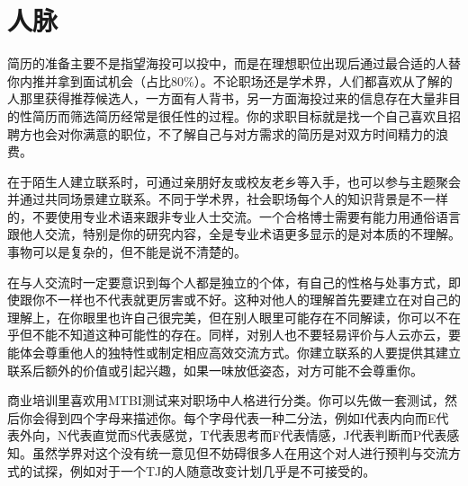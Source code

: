 \documentclass[]{tufte-book}
\newenvironment{Shaded}{}{}
\newcommand{\AttributeTok}[1]{\textcolor[rgb]{0.49,0.56,0.16}{#1}}
\newcommand{\CommentTok}[1]{\textcolor[rgb]{0.38,0.63,0.69}{\textit{#1}}}
\newcommand{\DecValTok}[1]{\textcolor[rgb]{0.25,0.63,0.44}{#1}}
\newcommand{\FunctionTok}[1]{\textcolor[rgb]{0.02,0.16,0.49}{#1}}
\newcommand{\NormalTok}[1]{#1}
\newcommand{\OtherTok}[1]{\textcolor[rgb]{0.00,0.44,0.13}{#1}}
\newcommand{\SpecialCharTok}[1]{\textcolor[rgb]{0.25,0.44,0.63}{#1}}
\newcommand{\StringTok}[1]{\textcolor[rgb]{0.25,0.44,0.63}{#1}}
\begin{document}
\hypertarget{ux4ebaux8109}{%
\section{人脉}\label{ux4ebaux8109}}

简历的准备主要不是指望海投可以投中，而是在理想职位出现后通过最合适的人替你内推并拿到面试机会（占比80\%）。不论职场还是学术界，人们都喜欢从了解的人那里获得推荐候选人，一方面有人背书，另一方面海投过来的信息存在大量非目的性简历而筛选简历经常是很任性的过程。你的求职目标就是找一个自己喜欢且招聘方也会对你满意的职位，不了解自己与对方需求的简历是对双方时间精力的浪费。

在于陌生人建立联系时，可通过亲朋好友或校友老乡等入手，也可以参与主题聚会并通过共同场景建立联系。不同于学术界，社会职场每个人的知识背景是不一样的，不要使用专业术语来跟非专业人士交流。一个合格博士需要有能力用通俗语言跟他人交流，特别是你的研究内容，全是专业术语更多显示的是对本质的不理解。事物可以是复杂的，但不能是说不清楚的。

在与人交流时一定要意识到每个人都是独立的个体，有自己的性格与处事方式，即使跟你不一样也不代表就更厉害或不好。这种对他人的理解首先要建立在对自己的理解上，在你眼里也许自己很完美，但在别人眼里可能存在不同解读，你可以不在乎但不能不知道这种可能性的存在。同样，对别人也不要轻易评价与人云亦云，要能体会尊重他人的独特性或制定相应高效交流方式。你建立联系的人要提供其建立联系后额外的价值或引起兴趣，如果一味放低姿态，对方可能不会尊重你。

商业培训里喜欢用MTBI测试来对职场中人格进行分类。你可以先做一套测试，然后你会得到四个字母来描述你。每个字母代表一种二分法，例如I代表内向而E代表外向，N代表直觉而S代表感觉，T代表思考而F代表情感，J代表判断而P代表感知。虽然学界对这个没有统一意见但不妨碍很多人在用这个对人进行预判与交流方式的试探，例如对于一个TJ的人随意改变计划几乎是不可接受的。

\begin{Shaded}
\end{Shaded}
\end{document}
